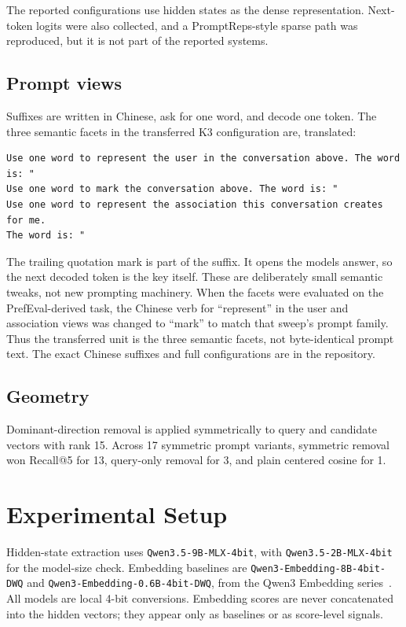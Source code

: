 \documentclass[
  10pt,
  letterpaper,
]{article}
\begin{document}
The reported configurations use hidden states as the dense
representation. Next-token logits were also collected, and a
PromptReps-style sparse path was reproduced, but it is not part of the
reported systems.

\subsection{Prompt views}\label{prompt-views}

Suffixes are written in Chinese, ask for one word, and decode one token.
The three semantic facets in the transferred K3 configuration are,
translated:

\begin{verbatim}
Use one word to represent the user in the conversation above. The word is: "
Use one word to mark the conversation above. The word is: "
Use one word to represent the association this conversation creates for me.
The word is: "
\end{verbatim}

The trailing quotation mark is part of the suffix. It opens the
model\textquotesingle s answer, so the next decoded token is the key
itself. These are deliberately small semantic tweaks, not new prompting
machinery. When the facets were evaluated on the PrefEval-derived task,
the Chinese verb for ``represent'' in the user and association views was
changed to ``mark'' to match that sweep's prompt family. Thus the
transferred unit is the three semantic facets, not byte-identical prompt
text. The exact Chinese suffixes and full configurations are in the
repository.

\subsection{Geometry}\label{geometry}

Dominant-direction removal is applied symmetrically to query and
candidate vectors with rank 15. Across 17 symmetric prompt variants,
symmetric removal won Recall@5 for 13, query-only removal for 3, and
plain centered cosine for 1.

\section{Experimental Setup}\label{experimental-setup}

Hidden-state extraction uses \texttt{Qwen3.5-9B-MLX-4bit}, with
\texttt{Qwen3.5-2B-MLX-4bit} for the model-size check. Embedding
baselines are \texttt{Qwen3-Embedding-8B-4bit-DWQ} and
\texttt{Qwen3-Embedding-0.6B-4bit-DWQ}, from the Qwen3 Embedding
series~\cite{zhang2025}. All models are local 4-bit conversions. Embedding scores are
never concatenated into the hidden vectors; they appear only as
baselines or as score-level signals.
\end{document}
